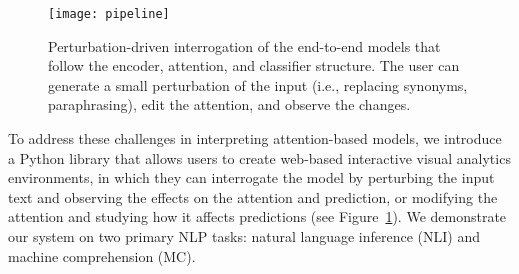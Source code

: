 \begin{figure}[htbp]
\centering
\vspace{-2mm}
 \texttt{[image: pipeline]}
 \vspace{-3mm}
 \caption{
 Perturbation-driven interrogation of the end-to-end models that follow the encoder, attention, and classifier structure. The user can generate a small perturbation of the input (i.e., replacing synonyms, paraphrasing), edit the attention, and observe the changes.
 }
 \vspace{-3mm}
\label{fig:modelPipeline}
\end{figure}


To address these challenges in interpreting attention-based models, 
we introduce a Python library that allows users to create web-based interactive visual analytics environments,
in which they can interrogate the model by perturbing the input text and observing the effects on the attention and prediction, or modifying the attention and studying how it affects predictions (see Figure~\ref{fig:modelPipeline}).
%
We demonstrate our system on two primary NLP tasks: natural language
inference (NLI) and machine comprehension (MC). 



